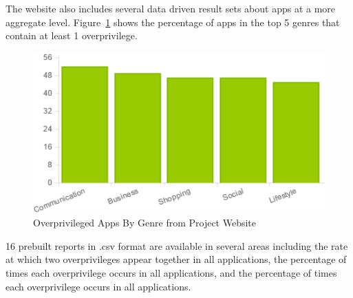 The website also includes several data driven result sets about apps at a more aggregate level. Figure~\ref{fig:overprivappsByGenre} shows the percentage of apps in the top 5 genres that contain at least 1 overprivilege.

 \begin{figure}[ht!]
\centering
\includegraphics[scale=.7]{images/overprivsByGenre.png}
\caption{Overprivileged Apps By Genre from Project Website}
\label{fig:overprivappsByGenre}
\end{figure}


16 prebuilt reports in .csv format are available in several areas including the rate at which two overprivileges appear together in all applications, the percentage of times each overprivilege occurs in all applications, and the percentage of times each overprivilege occurs in all applications.







